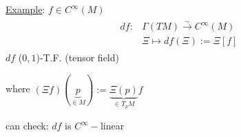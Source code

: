 \underline{Example}: $f\in C^{\infty}(M)$ 
\[
\begin{gathered}
  \begin{aligned} 
    df : & \Gamma(TM) \xrightarrow{ \sim } C^{\infty}(M) \\ 
    & \Xi \mapsto df(\Xi) := \Xi [f]
\end{aligned}
\end{gathered}
\]
$df$ ($0,1$)-T.F. (tensor field)

where $(\Xi f)(\underbrace{p}_{ \in M}) := \underbrace{ \Xi(p) }_{ \in T_pM}f$

can check: $df$ is $C^{\infty}-$linear
